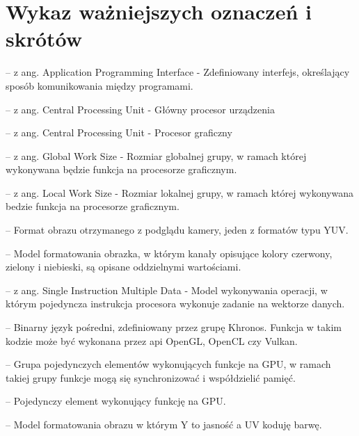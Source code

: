 
\clearpage
\section*{Wykaz ważniejszych oznaczeń i skrótów} %

\begin{description}[leftmargin=2.5cm,labelwidth=2cm]
\item[API] -- z ang. Application Programming Interface - Zdefiniowany interfejs, określający sposób komunikowania między programami.
\item[CPU] -- z ang. Central Processing Unit - Główny procesor urządzenia
\item[GPU] -- z ang. Central Processing Unit - Procesor graficzny
\item[GWS] -- z ang. Global Work Size - Rozmiar globalnej grupy, w ramach której wykonywana będzie funkcja na procesorze graficznym.
\item[LWS] -- z ang. Local Work Size - Rozmiar lokalnej grupy, w ramach której wykonywana bedzie funkcja na procesorze graficznym.
\item[NV21] -- Format obrazu otrzymanego z podglądu kamery, jeden z formatów typu YUV. 
\item[RGBA] -- Model formatowania obrazka, w którym kanały opisujące kolory czerwony, zielony i niebieski, są opisane oddzielnymi wartościami.
\item[SIMD] -- z ang. Single Instruction Multiple Data - Model wykonywania operacji, w którym pojedyncza instrukcja procesora wykonuje zadanie na wektorze danych.
\item[SPIRV] -- Binarny język pośredni, zdefiniowany przez grupę Khronos. Funkcja w takim kodzie może być wykonana przez api OpenGL, OpenCL czy Vulkan.
\item[Work Grupa] -- Grupa pojedynczych elementów wykonujących funkcje na GPU, w ramach takiej grupy funkcje mogą się synchronizować i współdzielić pamięć. 
\item[Work Item] -- Pojedynczy element wykonujący funkcję na GPU.
\item[YUV] -- Model formatowania obrazu w którym Y to jasność a UV koduję barwę.
\end{description}


